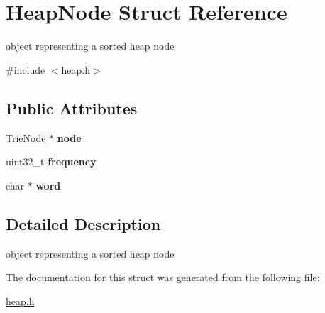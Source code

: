 \hypertarget{structHeapNode}{}\section{Heap\+Node Struct Reference}
\label{structHeapNode}


object representing a sorted heap node  




{\ttfamily \#include $<$heap.\+h$>$}

\subsection*{Public Attributes}
\begin{DoxyCompactItemize}
\item 
\mbox{\label{structHeapNode_a439ada678bd55152e85abc8c3df006c1}} 
\mbox{\hyperlink{structTrieNode}{Trie\+Node}} $\ast$ {\bfseries node}
\item 
\mbox{\label{structHeapNode_a5e988ec3c04ce1f37c655ee13f29c85b}} 
uint32\+\_\+t {\bfseries frequency}
\item 
\mbox{\label{structHeapNode_ae15bf59ce368c24ad93db38dec9e5623}} 
char $\ast$ {\bfseries word}
\end{DoxyCompactItemize}


\subsection{Detailed Description}
object representing a sorted heap node 

The documentation for this struct was generated from the following file\+:\begin{DoxyCompactItemize}
\item 
\mbox{\hyperlink{heap_8h}{heap.\+h}}\end{DoxyCompactItemize}
